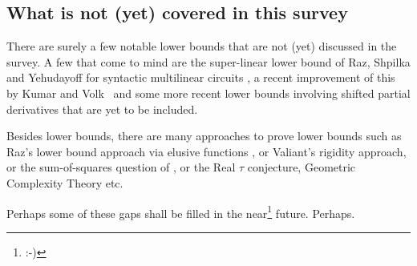 \subsection*{What is not (yet) covered in this survey}

There are surely a few notable lower bounds that are not (yet) discussed in the survey.
A few that come to mind are the super-linear lower bound of Raz, Shpilka and Yehudayoff for syntactic multilinear circuits \cite{RSY08}, a recent improvement of this by Kumar and Volk~\cite{KV17} and some more recent lower bounds involving shifted partial derivatives that are yet to be included. 

Besides lower bounds, there are many approaches to prove lower bounds such as Raz's lower bound approach via elusive functions \cite{Raz10elusive}, or Valiant's rigidity approach, or the sum-of-squares question of \cite{hwy}, or the Real $\tau$ conjecture, Geometric Complexity Theory etc.

Perhaps some of these gaps shall be filled in the near\footnote{:-)} future.
Perhaps.

